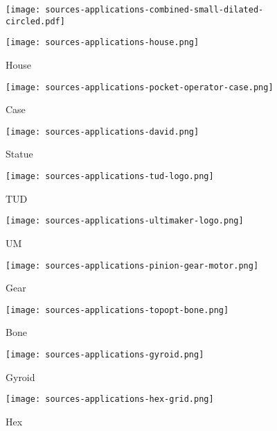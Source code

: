 \begin{figure*}
\centering
\setlength{\figwidth}{0.099\textwidth}
\setlength{\figheight}{0.099\textwidth}
\begin{subfigure}{\textwidth}\centering
\texttt{[image: sources-applications-combined-small-dilated-circled.pdf]}
\end{subfigure}
\begin{subfigure}[t]{\figwidth}\centering
\texttt{[image: sources-applications-house.png]}
\caption{House}\label{applications_house}
\end{subfigure}
\begin{subfigure}[t]{\figwidth}\centering
\texttt{[image: sources-applications-pocket-operator-case.png]}
\caption{Case}\label{applications_case}
\end{subfigure}
\begin{subfigure}[t]{\figwidth}\centering
\texttt{[image: sources-applications-david.png]}
\caption{Statue}\label{applications_statue}
\end{subfigure}
\begin{subfigure}[t]{\figwidth}\centering
\texttt{[image: sources-applications-tud-logo.png]}
\caption{TUD}\label{applications_tud}
\end{subfigure}
\begin{subfigure}[t]{\figwidth}\centering
\texttt{[image: sources-applications-ultimaker-logo.png]}
\caption{UM}\label{applications_um}
\end{subfigure}
\begin{subfigure}[t]{\figwidth}\centering
\texttt{[image: sources-applications-pinion-gear-motor.png]}
\caption{Gear}\label{applications_gear}
\end{subfigure}
\begin{subfigure}[t]{\figwidth}\centering
\texttt{[image: sources-applications-topopt-bone.png]}
\caption{Bone}\label{applications_bone}
\end{subfigure}
\begin{subfigure}[t]{\figwidth}\centering
\texttt{[image: sources-applications-gyroid.png]}
\caption{Gyroid}\label{applications_gyroid}
\end{subfigure}
\begin{subfigure}[t]{\figwidth}\centering
\texttt{[image: sources-applications-hex-grid.png]}
\caption{Hex}\label{applications_hex}

\end{subfigure}
\end{figure*}
